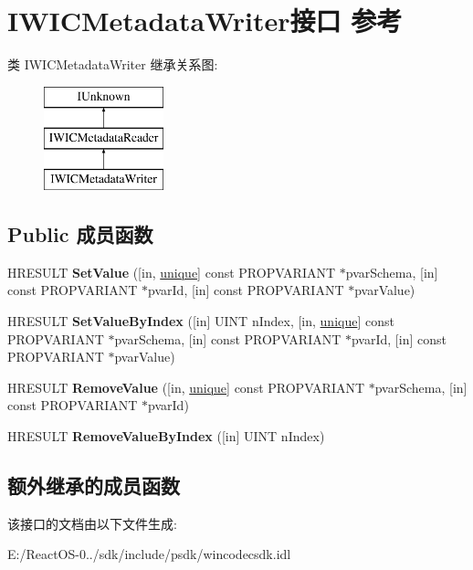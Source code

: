 \hypertarget{interface_i_w_i_c_metadata_writer}{}\section{I\+W\+I\+C\+Metadata\+Writer接口 参考}
\label{interface_i_w_i_c_metadata_writer}
类 I\+W\+I\+C\+Metadata\+Writer 继承关系图\+:\begin{figure}[H]
\begin{center}
\leavevmode
\includegraphics[height=3.000000cm]{interface_i_w_i_c_metadata_writer}
\end{center}
\end{figure}
\subsection*{Public 成员函数}
\begin{DoxyCompactItemize}
\item 
\mbox{\label{interface_i_w_i_c_metadata_writer_a775692dadc471421f4cf24a7636d8b3f}} 
H\+R\+E\+S\+U\+LT {\bfseries Set\+Value} (\mbox{[}in, \hyperlink{interfaceunique}{unique}\mbox{]} const P\+R\+O\+P\+V\+A\+R\+I\+A\+NT $\ast$pvar\+Schema, \mbox{[}in\mbox{]} const P\+R\+O\+P\+V\+A\+R\+I\+A\+NT $\ast$pvar\+Id, \mbox{[}in\mbox{]} const P\+R\+O\+P\+V\+A\+R\+I\+A\+NT $\ast$pvar\+Value)
\item 
\mbox{\label{interface_i_w_i_c_metadata_writer_a5c9c4a8a44b7f50709f8d4c9aa297939}} 
H\+R\+E\+S\+U\+LT {\bfseries Set\+Value\+By\+Index} (\mbox{[}in\mbox{]} U\+I\+NT n\+Index, \mbox{[}in, \hyperlink{interfaceunique}{unique}\mbox{]} const P\+R\+O\+P\+V\+A\+R\+I\+A\+NT $\ast$pvar\+Schema, \mbox{[}in\mbox{]} const P\+R\+O\+P\+V\+A\+R\+I\+A\+NT $\ast$pvar\+Id, \mbox{[}in\mbox{]} const P\+R\+O\+P\+V\+A\+R\+I\+A\+NT $\ast$pvar\+Value)
\item 
\mbox{\label{interface_i_w_i_c_metadata_writer_ad94a199586b5c7ef42b8003fea925301}} 
H\+R\+E\+S\+U\+LT {\bfseries Remove\+Value} (\mbox{[}in, \hyperlink{interfaceunique}{unique}\mbox{]} const P\+R\+O\+P\+V\+A\+R\+I\+A\+NT $\ast$pvar\+Schema, \mbox{[}in\mbox{]} const P\+R\+O\+P\+V\+A\+R\+I\+A\+NT $\ast$pvar\+Id)
\item 
\mbox{\label{interface_i_w_i_c_metadata_writer_aa9015c84d49e1229216b23d805f0fa82}} 
H\+R\+E\+S\+U\+LT {\bfseries Remove\+Value\+By\+Index} (\mbox{[}in\mbox{]} U\+I\+NT n\+Index)
\end{DoxyCompactItemize}
\subsection*{额外继承的成员函数}


该接口的文档由以下文件生成\+:\begin{DoxyCompactItemize}
\item 
E\+:/\+React\+O\+S-\/0../sdk/include/psdk/wincodecsdk.\+idl\end{DoxyCompactItemize}
